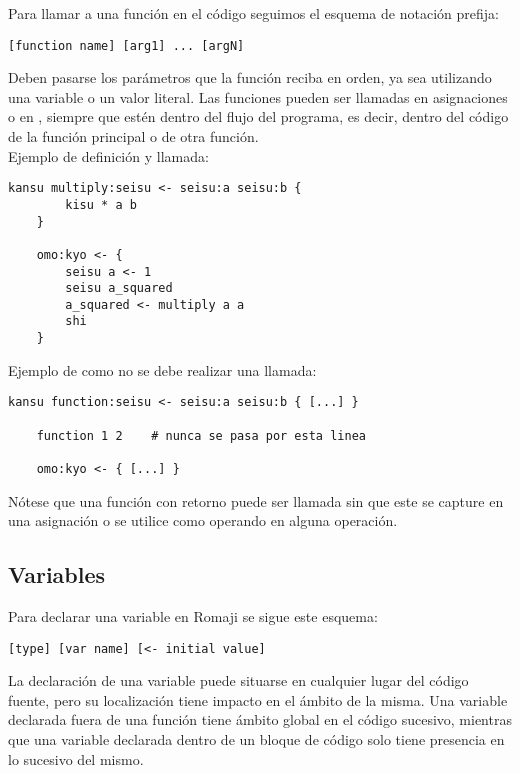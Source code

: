 \documentclass[spanish]{article}
\begin{document}
Para llamar a una función en el código seguimos el esquema de notación prefija:

\begin{lstlisting}[language=Romaji]
    [function name] [arg1] ... [argN]
\end{lstlisting}

Deben pasarse los parámetros que la función reciba en orden, ya sea utilizando una variable o un valor literal. Las funciones pueden ser llamadas en asignaciones o en , siempre que estén dentro del flujo del programa, es decir, dentro del código de la función principal o de otra función.\\

\newpage
Ejemplo de definición y llamada:

\begin{lstlisting}[language=Romaji]
    kansu multiply:seisu <- seisu:a seisu:b {
        kisu * a b
    }
    
    omo:kyo <- {
        seisu a <- 1
        seisu a_squared
        a_squared <- multiply a a
        shi
    }
\end{lstlisting}

Ejemplo de como no se debe realizar una llamada:

\begin{lstlisting}[language=Romaji]
    kansu function:seisu <- seisu:a seisu:b { [...] }
    
    function 1 2    # nunca se pasa por esta linea

    omo:kyo <- { [...] }
\end{lstlisting}

Nótese que una función con retorno puede ser llamada sin que este se capture en una asignación o se utilice como operando en alguna operación.

\subsection{Variables}
\label{sec:variables}

Para declarar una variable en Romaji se sigue este esquema:
\begin{lstlisting}[language=Romaji]
    [type] [var name] [<- initial value]
\end{lstlisting}

La declaración de una variable puede situarse en cualquier lugar del código fuente, pero su localización tiene impacto en el ámbito de la misma. Una variable declarada fuera de una función tiene ámbito global en el código sucesivo, mientras que una variable declarada dentro de un bloque de código solo tiene presencia en lo sucesivo del mismo.
\end{document}
